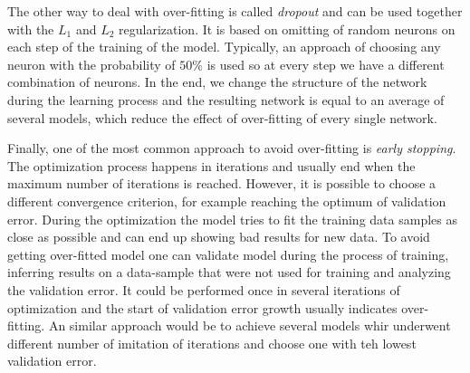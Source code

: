 The other way to deal with over-fitting is called \textit{dropout} and can be used together with the $L_{1}$ and $L_{2}$ regularization.
It is based on omitting of random neurons on each step of the training of the model.
Typically, an approach of choosing any neuron with the probability of $50\%$ is used so at every step we have a different combination of neurons.
In the end, we change the structure of the network during the learning process and the resulting network is equal to an average of several models, which reduce the effect of over-fitting of every single network.

Finally, one of the most common approach to avoid over-fitting is \textit{early stopping}.
The optimization process happens in iterations and usually end when the maximum number of iterations is reached.
However, it is possible to choose a different convergence criterion, for example reaching the optimum of validation error.
During the optimization the model tries to fit the training data samples as close as possible and can end up showing bad results for new data.
To avoid getting over-fitted model one can  validate model during the process of training, inferring results on a data-sample that were not used for training and analyzing the validation error.
It could be performed once in several iterations of optimization and the start of validation error growth usually indicates over-fitting.
An similar approach would be to achieve several models  whir underwent different number of imitation of iterations and choose one with teh lowest validation error.



